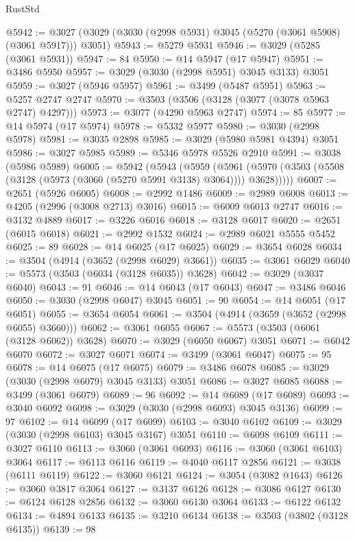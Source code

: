 \begin{lexlean}{RustStd}
\begin{coremodule}
@5942 := @3027 (@3029 (@3030 (@2998 @5931) @3045 (@5270 (@3061 @5908) (@3061 @5917))) @3051)
@5943 := @5279 @5931
@5946 := @3029 (@5285 (@3061 @5931))
@5947 := 84
@5950 := @14 @5947 (@17 @5947)
@5951 := @3486 @5950
@5957 := @3029 (@3030 (@2998 @5951) @3045 @3133) @3051
@5959 := @3027 (@5946 @5957)
@5961 := @3499 (@5487 @5951)
@5963 := @5257 @2747 @2747
@5970 := @3503 (@3506 (@3128 (@3077 (@3078 @5963 @2747) @4297)))
@5973 := @3077 (@4290 @5963 @2747)
@5974 := 85
@5977 := @14 @5974 (@17 @5974)
@5978 := @5332 @5977
@5980 := @3030 (@2998 @5978)
@5981 := @3035 @2898
@5985 := @3029 (@5980 @5981 @4394) @3051
@5986 := @3027 @5985
@5989 := @5346 @5978 @5526 @2910
@5991 := @3038 (@5986 @5989)
@6005 := @5942
    (@5943
      (@5959
        (@5961 (@5970 (@3503 (@5508 (@3128 (@5973 (@3060 (@5270 @5991 @3138) @3064)))) @3628)))))
@6007 := @2651 (@5926 @6005)
@6008 := @2992 @1486
@6009 := @2989 @6008
@6013 := @4205 (@2996 (@3008 @2713) @3016)
@6015 := @6009 @6013 @2747
@6016 := @3132 @4889
@6017 := @3226 @6016
@6018 := @3128 @6017
@6020 := @2651 (@6015 @6018)
@6021 := @2992 @1532
@6024 := @2989 @6021 @5555 @5452
@6025 := 89
@6028 := @14 @6025 (@17 @6025)
@6029 := @3654 @6028
@6034 := @3504 (@4914 (@3652 (@2998 @6029) @3661))
@6035 := @3061 @6029
@6040 := @5573 (@3503 (@6034 (@3128 @6035)) @3628)
@6042 := @3029 (@3037 @6040)
@6043 := 91
@6046 := @14 @6043 (@17 @6043)
@6047 := @3486 @6046
@6050 := @3030 (@2998 @6047) @3045
@6051 := 90
@6054 := @14 @6051 (@17 @6051)
@6055 := @3654 @6054
@6061 := @3504 (@4914 (@3659 (@3652 (@2998 @6055) @3660)))
@6062 := @3061 @6055
@6067 := @5573 (@3503 (@6061 (@3128 @6062)) @3628)
@6070 := @3029 (@6050 @6067) @3051
@6071 := @6042 @6070
@6072 := @3027 @6071
@6074 := @3499 (@3061 @6047)
@6075 := 95
@6078 := @14 @6075 (@17 @6075)
@6079 := @3486 @6078
@6085 := @3029 (@3030 (@2998 @6079) @3045 @3133) @3051
@6086 := @3027 @6085
@6088 := @3499 (@3061 @6079)
@6089 := 96
@6092 := @14 @6089 (@17 @6089)
@6093 := @3040 @6092
@6098 := @3029 (@3030 (@2998 @6093) @3045 @3136)
@6099 := 97
@6102 := @14 @6099 (@17 @6099)
@6103 := @3040 @6102
@6109 := @3029 (@3030 (@2998 @6103) @3045 @3167) @3051
@6110 := @6098 @6109
@6111 := @3027 @6110
@6113 := @3060 (@3061 @6093)
@6116 := @3060 (@3061 @6103) @3064
@6117 := @6113 @6116
@6119 := @4040 @6117 @2856
@6121 := @3038 (@6111 @6119)
@6122 := @3060 @6121
@6124 := @3054 (@3082 @1643)
@6126 := @3060 @3817 @3064
@6127 := @3137 @6126
@6128 := @3086 @6127
@6130 := @6124 @6128 @2856
@6132 := @3060 @6130 @3064
@6133 := @6122 @6132
@6134 := @4894 @6133
@6135 := @3210 @6134
@6138 := @3503 (@3802 (@3128 @6135))
@6139 := 98

\end{coremodule}
\end{lexlean}
